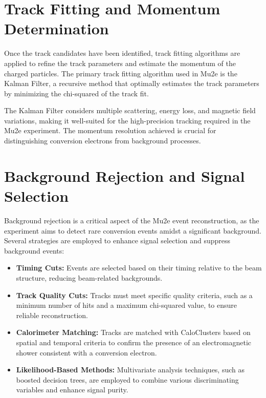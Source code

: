 \section{Track Fitting and Momentum Determination}

Once the track candidates have been identified, track fitting algorithms 
are applied to refine the track parameters and estimate the momentum of the 
charged particles. The primary track fitting algorithm used in Mu2e is the Kalman 
Filter, a recursive method that optimally estimates the track parameters by minimizing the chi-squared of the track fit.

The Kalman Filter considers multiple scattering, energy loss, and magnetic 
field variations, making it well-suited for the high-precision tracking 
required in the Mu2e experiment. The momentum resolution achieved is crucial 
for distinguishing conversion electrons from background processes.

\section{Background Rejection and Signal Selection}

Background rejection is a critical aspect of the Mu2e event reconstruction, 
as the experiment aims to detect rare conversion events amidst a significant 
background. Several strategies are employed to enhance signal selection and suppress background events:

\begin{itemize}
    \item \textbf{Timing Cuts:} Events are selected based on their timing relative 
    to the beam structure, reducing beam-related backgrounds.
    \item \textbf{Track Quality Cuts:} Tracks must meet specific quality criteria, 
    such as a minimum number of hits and a maximum chi-squared value, to ensure reliable reconstruction.
    \item \textbf{Calorimeter Matching:} Tracks are matched with CaloClusters based 
    on spatial and temporal criteria to confirm the presence of an electromagnetic 
    shower consistent with a conversion electron.
    \item \textbf{Likelihood-Based Methods:} Multivariate analysis techniques, such 
    as boosted decision trees, are employed to combine various discriminating 
    variables and enhance signal purity.
\end{itemize}

